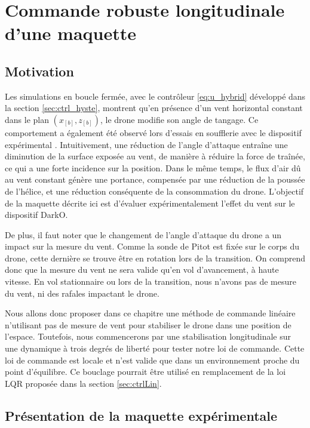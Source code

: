 \chapter{Commande robuste longitudinale d'une maquette}
\minitoc
\label{chap:3DOF}

\section{Motivation}
\label{sec:motivation3DOF}
Les simulations en boucle fermée, avec le contrôleur \eqref{eq:u_hybrid} développé dans la section \ref{sec:ctrl_hyste}, montrent qu'en présence d'un vent horizontal constant dans le plan $(x_{[b]},z_{[b]})$, le drone modifie son angle de tangage. Ce comportement a également été observé lors d'essais en soufflerie avec le dispositif expérimental \cite{olszaneckibarthHal-02542982}. Intuitivement, une réduction de l'angle d'attaque entraîne une diminution de la surface exposée au vent, de manière à réduire la force de traînée, ce qui a une forte incidence sur la position. Dans le même temps, le flux d'air dû au vent constant génère une portance, compensée par une réduction de la poussée de l'hélice, et une réduction conséquente de la consommation du drone. L'objectif de la maquette décrite ici est d'évaluer expérimentalement l'effet du vent sur le dispositif DarkO.

De plus, il faut noter que le changement de l'angle d'attaque du drone a un impact sur la mesure du vent. Comme la sonde de Pitot est fixée sur le corps du drone, cette dernière se trouve être en rotation lors de la transition. On comprend donc que la mesure du vent ne sera valide qu'en vol d'avancement, à haute vitesse. En vol stationnaire ou lors de la transition, nous n'avons pas de mesure du vent, ni des rafales impactant le drone.

Nous allons donc proposer dans ce chapitre une méthode de commande linéaire n'utilisant pas de mesure de vent pour stabiliser le drone dans une position de l'espace. Toutefois, nous commencerons par une stabilisation longitudinale sur une dynamique à trois degrés de liberté pour tester notre loi de commande. Cette loi de commande est locale et n'est valide que dans un environnement proche du point d'équilibre. Ce bouclage pourrait être utilisé en remplacement de la loi LQR proposée dans la section \ref{sec:ctrlLin}.

\section{Présentation de la maquette expérimentale}
\label{sec:test_bench}



